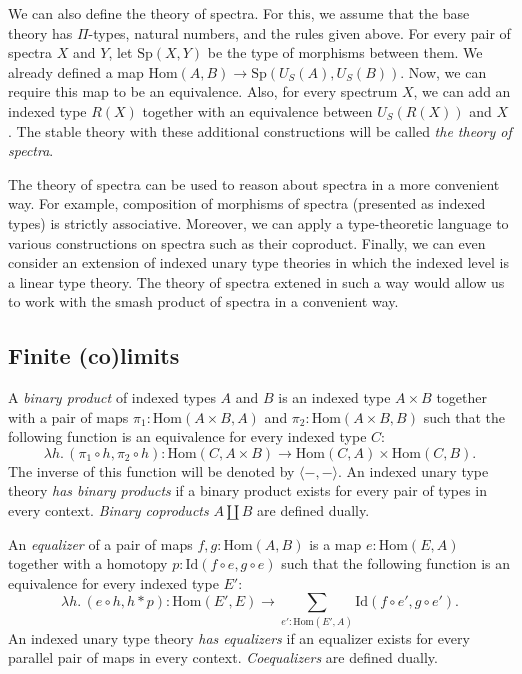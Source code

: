 \documentclass[reqno]{mscs}
\newcommand{\fs}[1]{\mathrm{#1}}
\newcommand{\Hom}{\fs{Hom}}
\newcommand{\Id}{\fs{Id}}
\numberwithin{figure}{section}
\begin{document}
We can also define the theory of spectra.
For this, we assume that the base theory has $\Pi$-types, natural numbers, and the rules given above.
For every pair of spectra $X$ and $Y$, let $\fs{Sp}(X,Y)$ be the type of morphisms between them.
We already defined a map $\Hom(A,B) \to \fs{Sp}(U_S(A),U_S(B))$.
Now, we can require this map to be an equivalence.
Also, for every spectrum $X$, we can add an indexed type $R(X)$ together with an equivalence between $U_S(R(X))$ and $X$.
The stable theory with these additional constructions will be called \emph{the theory of spectra}.

The theory of spectra can be used to reason about spectra in a more convenient way.
For example, composition of morphisms of spectra (presented as indexed types) is strictly associative.
Moreover, we can apply a type-theoretic language to various constructions on spectra such as their coproduct.
Finally, we can even consider an extension of indexed unary type theories in which the indexed level is a linear type theory.
The theory of spectra extened in such a way would allow us to work with the smash product of spectra in a convenient way.

\subsection{Finite (co)limits}

A \emph{binary product} of indexed types $A$ and $B$ is an indexed type $A \times B$ together with a pair of maps $\pi_1 : \Hom(A \times B, A)$ and $\pi_2 : \Hom(A \times B, B)$
such that the following function is an equivalence for every indexed type $C$:
\[ \lambda h.\,(\pi_1 \circ h, \pi_2 \circ h) : \Hom(C, A \times B) \to \Hom(C,A) \times \Hom(C,B). \]
The inverse of this function will be denoted by $\langle -, - \rangle$.
An indexed unary type theory \emph{has binary products} if a binary product exists for every pair of types in every context.
\emph{Binary coproducts} $A \amalg B$ are defined dually.

An \emph{equalizer} of a pair of maps $f,g : \Hom(A,B)$ is a map $e : \Hom(E,A)$ together with a homotopy $p : \Id(f \circ e, g \circ e)$
such that the following function is an equivalence for every indexed type $E'$:
\[ \lambda h.\,(e \circ h, h * p) : \Hom(E', E) \to \sum_{e' : \Hom(E',A)} \Id(f \circ e', g \circ e'). \]
An indexed unary type theory \emph{has equalizers} if an equalizer exists for every parallel pair of maps in every context.
\emph{Coequalizers} are defined dually.
\end{document}
